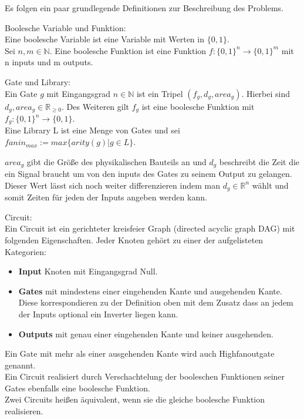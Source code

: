 \documentclass[11pt, a4paper, german]{article}
\begin{document}
Es folgen ein paar grundlegende Definitionen zur Beschreibung des Problems.

\begin{definition}{Boolesche Variable und Funktion: } \\
Eine boolesche Variable ist eine Variable mit Werten in $ \{ 0 , 1 \} $. \\
Sei $ n, m \in \mathbb{N}$. Eine boolesche Funktion ist eine Funktion $ f : \{ 0 , 1 \}^n \rightarrow \{ 0 , 1 \}^m $ mit n inputs und m outputs. 
\end{definition}

\begin{definition}{Gate und Library:}\\
Ein Gate $g$ mit Eingangsgrad $ n \in \mathbb{N}$ ist ein Tripel $(f_g, d_g, area_g)$. Hierbei sind $d_g, area_g \in \mathbb{R}_{\geq 0}$. Des Weiteren gilt $f_g$ ist eine boolesche Funktion mit $ f_g : \{0,1\}^n \rightarrow \{0, 1\} $. \\
Eine Library L ist eine Menge von Gates und sei $fanin_{max} := max\{ arity(g) | g \in L \}$.
\end{definition}
$area_g$ gibt die Größe des physikalischen Bauteils an und $d_g$ beschreibt die Zeit die ein Signal braucht um von den inputs des Gates zu seinem Output zu gelangen. Dieser Wert lässt sich noch weiter differenzieren indem man $d_g \in \mathbb{R}^n$ wählt und somit Zeiten für jeden der Inputs angeben werden kann. 

\begin{definition}{Circuit:}\\
Ein Circuit ist ein gerichteter kreisfeier Graph (directed acyclic graph DAG) mit folgenden Eigenschaften. Jeder Knoten gehört zu einer der aufgelisteten Kategorien: 
\begin{itemize}
\item{\bf Input} Knoten mit Eingangsgrad Null.
\item{\bf Gates} mit mindestens einer eingehenden Kante und ausgehenden Kante. Diese korrespondieren zu der Definition oben mit dem Zusatz dass an jedem der Inputs optional ein Inverter liegen kann.
\item{\bf Outputs} mit genau einer eingehenden Kante und keiner ausgehenden.
\end{itemize}
Ein Gate mit mehr als einer ausgehenden Kante wird auch Highfanoutgate genannt.\\
Ein Circuit realisiert durch Verschachtelung der booleschen Funktionen seiner Gates ebenfalls eine boolesche Funktion. \\
Zwei Circuits heißen äquivalent, wenn sie die gleiche boolesche Funktion realisieren.
\end{definition}
\end{document}

